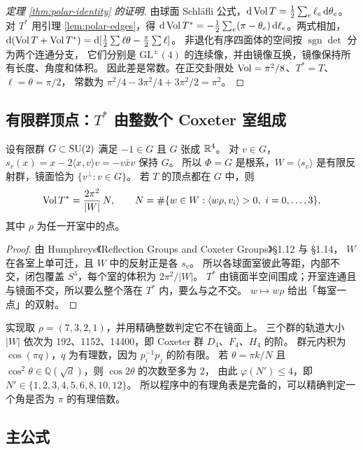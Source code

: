 \begin{proof}[定理 \ref{thm:polar-identity} 的证明]
由球面 Schläfli 公式，$\mathrm d\operatorname{Vol} T=\frac12\sum_e\ell_e\,\mathrm d\theta_e$。
对 $T^*$ 用引理 \ref{lem:polar-edges}，得
$\mathrm d\operatorname{Vol} T^*=-\frac12\sum_e(\pi-\theta_e)\,\mathrm d\ell_e$。两式相加，
$\mathrm d(\operatorname{Vol} T+\operatorname{Vol} T^*)=\mathrm d[\frac12\sum\ell\theta-\frac\pi2\sum\ell]$。
非退化有序四面体的空间按 $\operatorname{sgn}\det$ 分为两个连通分支，
它们分别是 $\mathrm{GL}^\pm(4)$ 的连续像，并由镜像互换，镜像保持所有长度、角度和体积。
因此差是常数。在正交卦限处 $\operatorname{Vol}=\pi^2/8$、$T^*=T$、$\ell=\theta=\pi/2$，
常数为 $\pi^2/4-3\pi^2/4+3\pi^2/2=\pi^2$。
\end{proof}

\subsection{有限群顶点：$T^*$ 由整数个 Coxeter 室组成}

\begin{theorem}\label{thm:coxeter-chambers}
设有限群 $G\subset\mathrm{SU}(2)$ 满足 $-1\in G$ 且 $G$ 张成 $\mathbb R^4$。
对 $v\in G$，$s_v(x)=x-2\langle x,v\rangle v=-v\bar xv$ 保持 $G$。
所以 $\Phi=G$ 是根系，$W=\langle s_v\rangle$ 是有限反射群，镜面恰为 $\{v^\perp:v\in G\}$。
若 $T$ 的顶点都在 $G$ 中，则
\[
\operatorname{Vol} T^*=\frac{2\pi^2}{|W|}\,N,\qquad
N=\#\{w\in W:\langle w\rho,v_i\rangle>0,\ i=0,\ldots,3\},
\]
其中 $\rho$ 为任一开室中的点。
\end{theorem}

\begin{proof}
由 Humphreys《Reflection Groups and Coxeter Groups》\S1.12 与 \S1.14，
$W$ 在各室上单可迁，且 $W$ 中的反射正是各 $s_v$。
所以各球面室彼此等距，内部不交，闭包覆盖 $S^3$，每个室的体积为 $2\pi^2/|W|$。
$T^*$ 由镜面半空间围成；开室连通且与镜面不交，所以要么整个落在 $T^*$ 内，要么与之不交。
$w\mapsto w\rho$ 给出「每室一点」的双射。
\end{proof}

实现取 $\rho=(7,3,2,1)$，并用精确整数判定它不在镜面上。
三个群的轨道大小 $|W|$ 依次为 192、1152、14400，即 Coxeter 群 $D_4$、$F_4$、$H_4$ 的阶。
群元内积为 $\cos(\pi q)$，$q$ 为有理数，因为 $p_i^{-1}p_j$ 的阶有限。
若 $\theta=\pi k/N$ 且 $\cos^2\theta\in\mathbb Q(\sqrt d)$，则 $\cos2\theta$ 的次数至多为 2，
由此 $\varphi(N')\le4$，即 $N'\in\{1,2,3,4,5,6,8,10,12\}$。
所以程序中的有理角表是完备的，可以精确判定一个角是否为 $\pi$ 的有理倍数。

\subsection{主公式}

